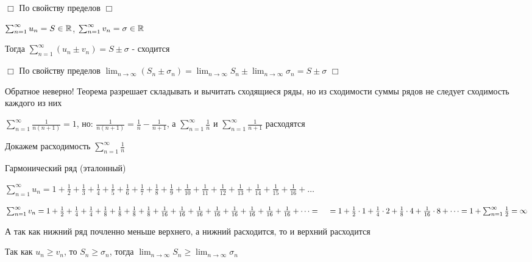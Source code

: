 \documentclass[12pt]{article}
\begin{document}
    \begin{tcolorbox}
        $\Box$ По свойству пределов $\Box$
    \end{tcolorbox}

    \begin{MyTheorem}
         $\sum_{n = 1}^\infty u_n = S \in \mathbb{R}$, $\sum_{n = 1}^\infty v_n = \sigma \in \mathbb{R}$

        Тогда $\sum_{n = 1}^\infty (u_n \pm v_n) = S \pm \sigma$ - сходится
    \end{MyTheorem}

    \begin{tcolorbox}
        $\Box$ По свойству пределов $\lim_{n \to\infty} (S_n \pm \sigma_n) = \lim_{n \to\infty} S_n \pm \lim_{n \to\infty} \sigma_n = S \pm \sigma$ $\Box$
    \end{tcolorbox}

    \Nota Обратное неверно! Теорема разрешает складывать и вычитать сходящиеся ряды, но из сходимости суммы рядов не следует сходимость каждого из них

    \Exs $\sum_{n = 1}^\infty \frac{1}{n (n + 1)} = 1$, \quad но: $\frac{1}{n (n + 1)} = \frac{1}{n} - \frac{1}{n + 1}$,
    а $\sum_{n = 1}^\infty \frac{1}{n}$ и $\sum_{n = 1}^\infty \frac{1}{n + 1}$ расходятся

    \Nota Докажем расходимость $\sum_{n = 1}^\infty \frac{1}{n}$

    \hypertarget{harmonicseries}{}

    \Exs Гармонический ряд (эталонный)

    $\sum_{n = 1}^\infty u_n = 1 + \frac{1}{2} + \frac{1}{3} + \frac{1}{4} + \frac{1}{5} + \frac{1}{6} + \frac{1}{7} + \frac{1}{8} + \frac{1}{9} + \frac{1}{10} + \frac{1}{11} + \frac{1}{12} + \frac{1}{13} + \frac{1}{14} + \frac{1}{15} + \frac{1}{16} + \dots$

    $\sum_{n = 1}^\infty v_n = 1 + \frac{1}{2} + \frac{1}{4} + \frac{1}{4} + \frac{1}{8} + \frac{1}{8} + \frac{1}{8} + \frac{1}{8} + \frac{1}{16} + \frac{1}{16} + \frac{1}{16} + \frac{1}{16} + \frac{1}{16} + \frac{1}{16} + \frac{1}{16} + \frac{1}{16} + \dots = \\
    \quad = 1 + \frac{1}{2} \cdot 1 + \frac{1}{4} \cdot 2 + \frac{1}{8} \cdot 4 + \frac{1}{16} \cdot 8 + \dots = 1 + \sum_{n = 1}^\infty \frac{1}{2} = \infty$

    А так как нижний ряд почленно меньше верхнего, а нижний расходится, то и верхний расходится

    Так как $u_n \geq v_n$, то $S_n \geq \sigma_n$, тогда $\lim_{n \to\infty} S_n \geq \lim_{n \to\infty} \sigma_n$
\end{document}
